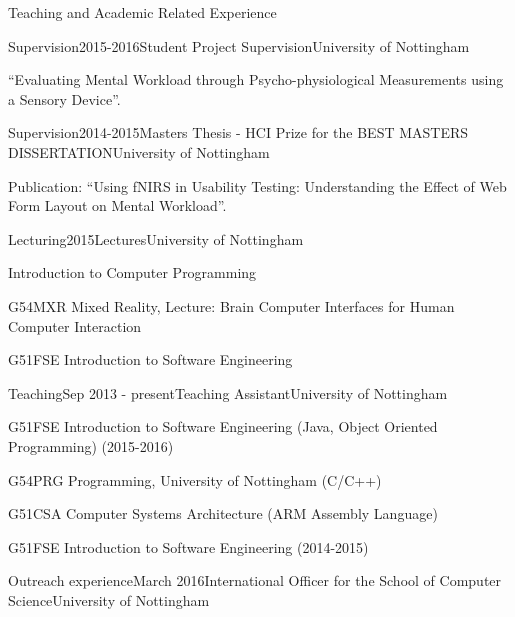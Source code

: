 \documentclass{resume} %
\begin{document}
\begin{rSection}{Teaching and Academic Related Experience}
	\begin{rSubsection}{Supervision}{2015-2016}{Student Project Supervision}{University of Nottingham}
        \item  ``Evaluating Mental Workload through Psycho-physiological Measurements using a Sensory Device''.
    \end{rSubsection}
    \vspace{-1 mm}

    \begin{rSubsection}{Supervision}{2014-2015}{Masters Thesis - HCI Prize for the BEST MASTERS DISSERTATION}{University of Nottingham}
        \item  Publication: ``Using fNIRS in Usability Testing: Understanding the Effect of Web Form Layout on Mental Workload''.
    \end{rSubsection}
\vspace{-1 mm}
    \begin{rSubsection}{Lecturing}{2015}{Lectures}{University of Nottingham}
    	\item Introduction to Computer Programming 
        \item G54MXR Mixed Reality, Lecture: Brain Computer Interfaces for Human Computer Interaction
        \item G51FSE Introduction to Software Engineering
    \end{rSubsection}
\vspace{-1 mm}
    \begin{rSubsection}{Teaching}{Sep 2013 - present}{Teaching Assistant}{University of Nottingham}
        \item G51FSE Introduction to Software Engineering (Java, Object Oriented Programming) (2015-2016)
        \item G54PRG Programming, University of Nottingham (C/C++)
        \item G51CSA Computer Systems Architecture (ARM Assembly Language)
        \item G51FSE Introduction to Software Engineering (2014-2015)
    \end{rSubsection}
\vspace{-1 mm}
    \begin{rSubsection}{Outreach experience}{March 2016}{International Officer for the School of Computer Science}{University of Nottingham}

\end{rSubsection}
\end{rSection}
\end{document}
